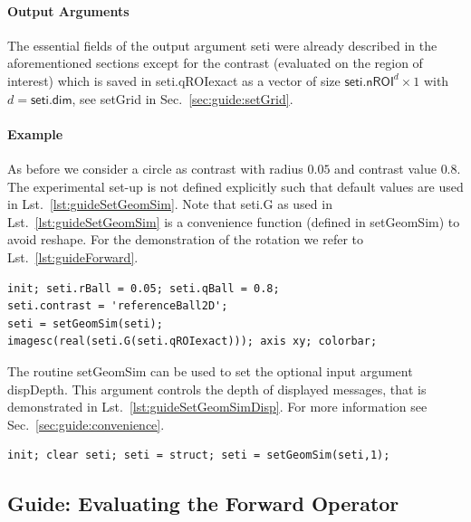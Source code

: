 \documentclass[a4paper]{article}
\begin{document}
\paragraph{Output Arguments} The essential fields of the output argument \textsf{seti} were already described in the aforementioned sections except for the contrast (evaluated on the region of interest) which is saved in \textsf{seti.qROIexact} as a vector of size $\textsf{seti.nROI}^d \times 1$ with $d = \textsf{seti.dim}$, see \textsf{setGrid} in Sec.~\ref{sec:guide:setGrid}.

\paragraph{Example} As before we consider a circle as contrast with radius $0.05$ and contrast value $0.8$. The experimental set-up is not defined explicitly such that default values are used in Lst.~\ref{lst:guideSetGeomSim}. 
Note that \textsf{seti.G} as used in Lst.~\ref{lst:guideSetGeomSim} is a convenience function (defined in \textsf{setGeomSim}) to avoid \textsf{reshape}. 
For the demonstration of the rotation we refer to Lst.~\ref{lst:guideForward}. 

\begin{lstlisting}[caption={Set the experimental set-up and the contrast by \textsf{setGeomSim} (\emph{source code}: \textsf{guides/guideSetGeomSim.m}).},label=lst:guideSetGeomSim]
init; seti.rBall = 0.05; seti.qBall = 0.8; 
seti.contrast = 'referenceBall2D';
seti = setGeomSim(seti);
imagesc(real(seti.G(seti.qROIexact))); axis xy; colorbar;
\end{lstlisting}

The routine \textsf{setGeomSim} can be used to set the optional input argument \textsf{dispDepth}. This argument controls the depth of displayed messages, that is demonstrated in Lst.~\ref{lst:guideSetGeomSimDisp}. For more information see Sec.~\ref{sec:guide:convenience}.

\begin{lstlisting}[caption={Routine \textsf{setGeomSim} with optional input argument \textsf{dispDepth} (\emph{source code}: \textsf{guides/guideSetGeomSimDisp.m}).},label=lst:guideSetGeomSimDisp]
init; clear seti; seti = struct; seti = setGeomSim(seti,1);
\end{lstlisting}


\subsection{Guide: Evaluating the Forward Operator}\label{sec:guide:forward}
\end{document}
